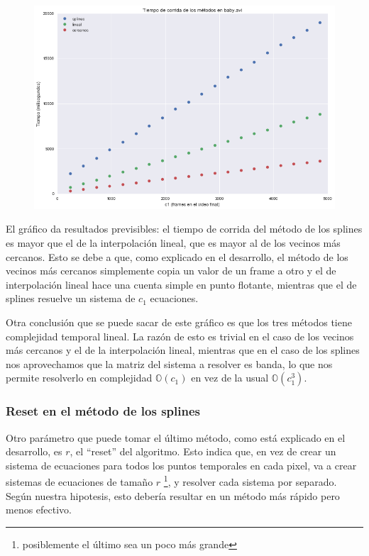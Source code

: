 \begin{figure}[H]
\centering
\includegraphics[width=.95\textwidth]{graficos/tiempo_baby.png}
\end{figure}

El gr\'afico da resultados previsibles: el tiempo de corrida del m\'etodo de los
splines es mayor que el de la interpolaci\'on lineal, que es mayor al de los
vecinos m\'as cercanos. Esto se debe a que, como explicado en el desarrollo,
el m\'etodo de los vecinos m\'as cercanos simplemente copia un valor de un
frame a otro y el de interpolaci\'on lineal hace una cuenta simple en punto
flotante, mientras que el de splines resuelve un sistema de $c_1$ ecuaciones.

Otra conclusi\'on que se puede sacar de este gr\'afico es que los tres m\'etodos
tiene complejidad temporal lineal. La raz\'on de esto es trivial en el caso de los
vecinos m\'as cercanos y el de la interpolaci\'on lineal, mientras que en el
caso de los splines nos aprovechamos que la matriz del sistema a resolver es
banda, lo que nos permite resolverlo en complejidad $\mathbb{O}(c_1)$ en vez de
la usual $\mathbb{O}(c_1^3)$.

\subsubsection{Reset en el m\'etodo de los splines}

Otro par\'ametro que puede tomar el \'ultimo m\'etodo, como est\'a explicado en
el desarrollo, es $r$, el ``reset'' del algoritmo. Esto indica que, en vez de
crear un sistema de ecuaciones para todos los puntos temporales en cada pixel,
va a crear sistemas de ecuaciones de tama\~no $r$ \footnote{posiblemente el
\'ultimo sea un poco m\'as grande}, y resolver cada sistema por separado.
Seg\'un nuestra hipotesis, esto deber\'ia resultar en un m\'etodo m\'as r\'apido
pero menos efectivo.

